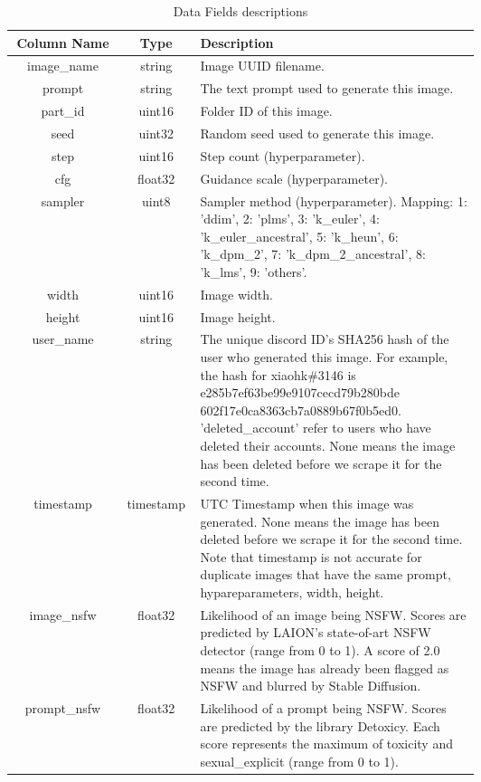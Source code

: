 \begin{table}[h]
    \begin{center}
        \begin{tabular}{||c c p{0.6\linewidth}||} 
         \hline
         Column Name & Type & Description \\ [0.5ex] 
         \hline\hline
         image\_name & string & Image UUID filename. \\ 
         \hline
         prompt & string & The text prompt used to generate this image. \\ 
         \hline
         part\_id & uint16 &	Folder ID of this image. \\ 
         \hline
         seed & uint32 & Random seed used to generate this image. \\ 
         \hline
         step & uint16 & Step count (hyperparameter). \\ 
         \hline
         cfg & float32 & Guidance scale (hyperparameter). \\ 
         \hline
         sampler & uint8 & Sampler method (hyperparameter). Mapping: 1: 'ddim', 2: 'plms', 3: 'k\_euler', 4: 'k\_euler\_ancestral', 5: 'k\_heun', 6: 'k\_dpm\_2', 7: 'k\_dpm\_2\_ancestral', 8: 'k\_lms', 9: 'others'. \\ 
         \hline
         width & uint16 & Image width. \\ 
         \hline
         height	& uint16 & Image height. \\ 
         \hline
         user\_name & string & The unique discord ID's SHA256 hash of the user who generated this image. For example, the hash for xiaohk\#3146 is e285b7ef63be99e9107cecd79b280bde 602f17e0ca8363cb7a0889b67f0b5ed0. 'deleted\_account' refer to users who have deleted their accounts. None means the image has been deleted before we scrape it for the second time. \\ 
         \hline
         timestamp & timestamp & UTC Timestamp when this image was generated. None means the image has been deleted before we scrape it for the second time. Note that timestamp is not accurate for duplicate images that have the same prompt, hypareparameters, width, height. \\ 
         \hline
         image\_nsfw & float32 & Likelihood of an image being NSFW. Scores are predicted by LAION's state-of-art NSFW detector (range from 0 to 1). A score of 2.0 means the image has already been flagged as NSFW and blurred by Stable Diffusion. \\ 
         \hline
         prompt\_nsfw & float32 & Likelihood of a prompt being NSFW. Scores are predicted by the library Detoxicy. Each score represents the maximum of toxicity and sexual\_explicit (range from 0 to 1). \\ [1ex] 
         \hline
        \end{tabular}
    \end{center}
    \caption{Data Fields descriptions \autocite{poloclub-diffusiondb}} %
    \label{metadata}
\end{table}


